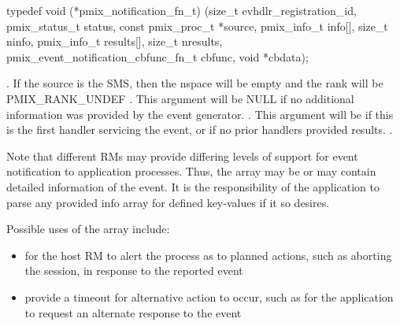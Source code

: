 \cspecificstart
\begin{codepar}
typedef void (*pmix_notification_fn_t)
    (size_t evhdlr_registration_id,
     pmix_status_t status,
     const pmix_proc_t *source,
     pmix_info_t info[], size_t ninfo,
     pmix_info_t results[], size_t nresults,
     pmix_event_notification_cbfunc_fn_t cbfunc,
     void *cbdata);
\end{codepar}
\cspecificend

\begin{arglist}
. If the source is the \ac{SMS}, then the nspace will be empty and the rank will be PMIX_RANK_UNDEF
. This argument will be NULL if no additional information was provided by the event generator.
. This argument will be  if this is the first handler servicing the event, or if no prior handlers provided results.
.
\end{arglist}

\descr

Note that different \acp{RM} may provide differing levels of support for event notification to application processes. Thus, the  array may be  or may contain detailed information of the event. It is the responsibility of the application to parse any provided info array for defined key-values if it so desires.

\adviceuserstart
Possible uses of the  array include:

\begin{itemize}
%
\item for the host \ac{RM} to alert the process as to planned actions, such as aborting the session, in response to the reported event
%
\item provide a timeout for alternative action to occur, such as for the application to request an alternate response to the event
%
\end{itemize}

